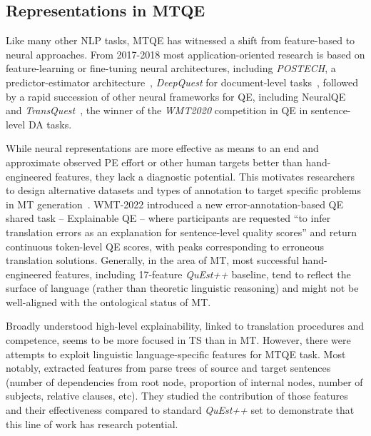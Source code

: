 \subsection{\label{ssec:mtqe}Representations in MTQE}
Like many other NLP tasks, MTQE has witnessed a shift from feature-based to neural approaches.
From 2017-2018 most application-oriented research is based on feature-learning or fine-tuning neural architectures, including \textit{POSTECH}, a predictor-estimator architecture~\cite{Kim2017a}, \textit{DeepQuest} for document-level tasks~\cite{Ive2018}, followed by a rapid succession of other neural frameworks for QE, including NeuralQE~\cite{Martins2017} and \textit{TransQuest}~\cite{Ranasinghe2020}, the winner of the \textit{WMT2020} competition in QE in sentence-level DA tasks.

While neural representations are more effective as means to an end and approximate observed \gls{PE} effort or other human targets better than hand-engineered features, they lack a diagnostic potential. This motivates researchers to design alternative datasets and types of annotation to target specific problems in MT generation~\cite[see research by][mentioned above]{Scarton2016, Voita2019}. 
WMT-2022 introduced a new error-annotation-based QE shared task -- Explainable QE -- where participants are requested ``to infer translation errors as an explanation for sentence-level quality scores'' and return continuous token-level QE scores, with peaks corresponding to erroneous translation solutions.
Generally, in the area of MT, most successful hand-engineered features, including 17-feature \textit{QuEst++} baseline, tend to reflect the surface of language (rather than theoretic linguistic reasoning) and might not be well-aligned with the ontological status of MT.

Broadly understood high-level explainability, linked to translation procedures and competence, seems to be more focused in TS than in MT.
However, there were attempts to exploit linguistic language-specific features for MTQE task. Most notably, \citet{Kozlova2016} extracted features from parse trees of source and target sentences (number of dependencies from root node, proportion of internal nodes, number of subjects, relative clauses, etc). They studied the contribution of those features and their effectiveness compared to standard \textit{QuEst++} set to demonstrate that this line of work has research potential. %

